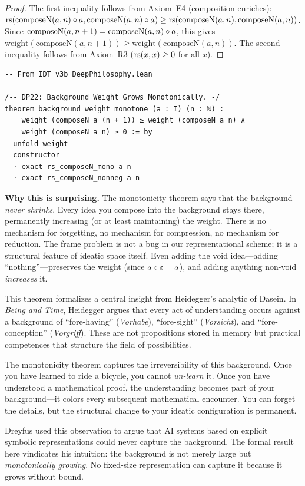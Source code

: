 \begin{proof}
The first inequality follows from Axiom~E4 (composition enriches):
$\mathrm{rs}(\mathrm{composeN}(a,n) \circ a, \mathrm{composeN}(a,n) \circ a) \geq
\mathrm{rs}(\mathrm{composeN}(a,n), \mathrm{composeN}(a,n))$.  Since $\mathrm{composeN}(a,n+1) =
\mathrm{composeN}(a,n) \circ a$, this gives
$\mathrm{weight}(\mathrm{composeN}(a,n+1)) \geq \mathrm{weight}(\mathrm{composeN}(a,n))$.
The second inequality follows from Axiom~R3 ($\mathrm{rs}(x,x) \geq 0$
for all $x$).
\end{proof}

\begin{lstlisting}
-- From IDT_v3b_DeepPhilosophy.lean

/-- DP22: Background Weight Grows Monotonically. -/
theorem background_weight_monotone (a : I) (n : ℕ) :
    weight (composeN a (n + 1)) ≥ weight (composeN a n) ∧
    weight (composeN a n) ≥ 0 := by
  unfold weight
  constructor
  · exact rs_composeN_mono a n
  · exact rs_composeN_nonneg a n
\end{lstlisting}

\begin{surprisebox}
\noindent\textbf{Why this is surprising.}
The monotonicity theorem says that the background \emph{never shrinks}.
Every idea you compose into the background stays there, permanently
increasing (or at least maintaining) the weight.  There is no mechanism
for forgetting, no mechanism for compression, no mechanism for reduction.
The frame problem is not a bug in our representational scheme; it is
a structural feature of ideatic space itself.  Even adding the void
idea---adding ``nothing''---preserves the weight (since $a \circ \varepsilon = a$),
and adding anything non-void \emph{increases} it.
\end{surprisebox}

\begin{interpretation}
\label{interp:heidegger-background}
This theorem formalizes a central insight from Heidegger's analytic of
Dasein.  In \textit{Being and Time}, Heidegger argues that every act of
understanding occurs against a background of ``fore-having''
(\textit{Vorhabe}), ``fore-sight'' (\textit{Vorsicht}), and ``fore-conception''
(\textit{Vorgriff}).  These are not propositions stored in memory but
practical competences that structure the field of possibilities.

The monotonicity theorem captures the irreversibility of this background.
Once you have learned to ride a bicycle, you cannot \emph{un-learn} it.
Once you have understood a mathematical proof, the understanding becomes
part of your background---it colors every subsequent mathematical
encounter.  You can forget the details, but the structural change to
your ideatic configuration is permanent.

Dreyfus used this observation to argue that AI systems based on explicit
symbolic representations could never capture the background.  The
formal result here vindicates his intuition: the background is not
merely large but \emph{monotonically growing}.  No fixed-size
representation can capture it because it grows without bound.
\end{interpretation}

